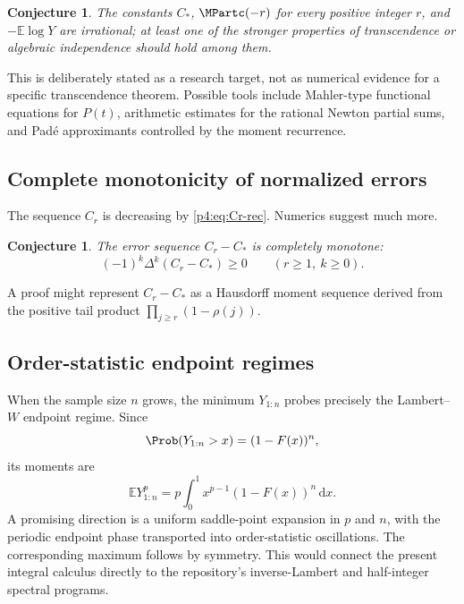 \documentclass[11pt,oneside]{article}
\newtheorem{conjecture}[theorem]{Conjecture}
\theoremstyle{definition}
\theoremstyle{remark}
\newcommand{\F}{F}
\newcommand{\E}{\mathbb E}
\newcommand{\dd}{\,\mathrm d}
\newcommand{\1}{\mathbf 1}
\begin{document}
\begin{conjecture}\label{p4:conj:irrationality}
The constants \(C_*\), \(\MPartc(-r)\) for every positive integer \(r\), and
\(-\E\log Y\) are irrational; at least one of the stronger properties of
transcendence or algebraic independence should hold among them.
\end{conjecture}

This is deliberately stated as a research target, not as numerical evidence for a
specific transcendence theorem.  Possible tools include Mahler-type functional
equations for \(P(t)\), arithmetic estimates for the rational Newton partial sums, and
Pad\'e approximants controlled by the moment recurrence.

\subsection{Complete monotonicity of normalized errors}

The sequence \(C_r\) is decreasing by \cref{p4:eq:Cr-rec}.  Numerics suggest much more.

\begin{conjecture}\label{p4:conj:complete-monotone}
The error sequence \(C_r-C_*\) is completely monotone:
\begin{equation}\label{p4:eq:complete-monotone-conj}
 (-1)^k\Delta^k(C_r-C_*)\ge0
 \qquad(r\ge1,\ k\ge0).
\end{equation}
\end{conjecture}

A proof might represent \(C_r-C_*\) as a Hausdorff moment sequence derived from the
positive tail product \(\prod_{j\ge r}(1-\rho(j))\).

\subsection{Order-statistic endpoint regimes}

When the sample size \(n\) grows, the minimum \(Y_{1:n}\) probes precisely the
Lambert--\(W\) endpoint regime.  Since
\[
 \Prob(Y_{1:n}>x)=(1-\F(x))^n,
\]
its moments are
\begin{equation}\label{p4:eq:min-order-moment}
 \E Y_{1:n}^p=p\int_0^1x^{p-1}(1-\F(x))^n\dd x.
\end{equation}
A promising direction is a uniform saddle-point expansion in \(p\) and \(n\), with the
periodic endpoint phase transported into order-statistic oscillations.  The corresponding
maximum follows by symmetry.  This would connect the present integral calculus directly
to the repository's inverse-Lambert and half-integer spectral programs.
\end{document}
